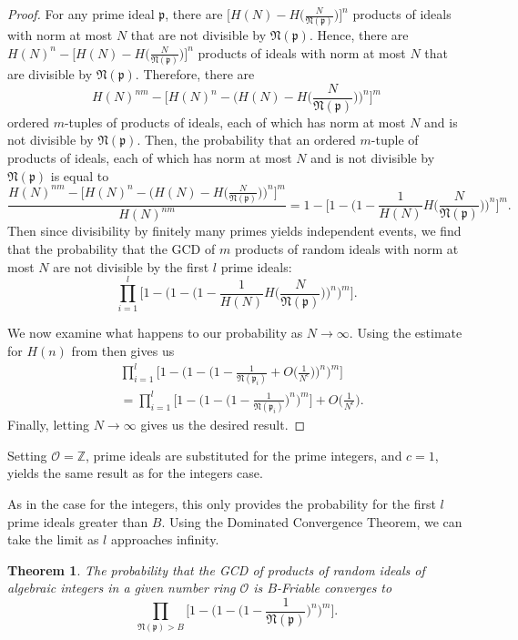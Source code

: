 \documentclass[12pt]{amsart}
\newtheorem{theorem}{Theorem}[subsection]
\theoremstyle{definition}
\newcommand{\f}[1]{\mathfrak{#1}}
\begin{document}
\begin{proof}
	For any prime ideal $\mathfrak{p}$, there are $\bigl[H(N)-H\bigl(\frac{N}{\f{N(p)}}\bigr)\bigr]^n$ products of ideals with norm at most $N$ that are not divisible by $\f{N(p)}$. Hence, there are  $H(N)^n-\bigl[H(N)-H\bigl(\frac{N}{\f{N(p)}}\bigr)\bigr]^n$ products of ideals with norm at most \(N\) that are divisible by $\f{N(p)}$. Therefore, there are 
	$$H(N)^{nm}-\Big[H(N)^n - \Big(H(N) - H\Big(\frac{N}{\f{N(p)}}\Big)\Big)^n\Big]^m$$
	ordered $m$-tuples of products of ideals, each of which has norm at most $N$ and is not divisible by $\f{N(p)}$. Then, the probability that an ordered $m$-tuple of products of ideals, each of which has norm at most $N$ and is not divisible by $\f{N(p)}$ is equal to
	$$\frac{H(N)^{nm}-\Big[H(N)^n - \Big(H(N) - H\Big(\frac{N}{\f{N(p)}}\Big)\Big)^n\Big]^m}{H(N)^{nm}} = 1 - \Big[1 - \Big(1 - \frac{1}{H(N)} H\Big(\frac{N}{\f{N(p)}}\Big)\Big)^n\Big]^m.$$
	Then since divisibility by finitely many primes yields independent events, we find that the probability that the GCD of $m$ products of random ideals with norm at most $N$ are not divisible by the first $l$ prime ideals:
	$$\prod_{i=1}^{l} \Big[1 - \Big(1 - \Big(1 - \frac{1}{H(N)} H\Big(\frac{N}{\f{N(p)}}\Big)\Big)^n \Big)^m \Big].$$
	
	We now examine what happens to our probability as $N \to \infty$. Using the estimate for $H(n)$ from \cite{Marcus} then gives us
	\begin{align*}
		&\prod_{i=1}^{l} \Big[1 - \Big(1 - \Big(1 - \frac{1}{\f{N}(\f{p}_i)} + O\Big(\frac{1}{N^{\epsilon}}\Big) \Big)^n \Big)^m\Big]\\
		&=\prod_{i=1}^{l} \Big[1 - \Big(1 - \Big(1 - \frac{1}{\f{N}(\f{p}_i)}\Big)^n \Big)^m \Big] + O\Big(\frac{1}{N^{\epsilon}}\Big).
	\end{align*}
	Finally, letting $N\to\infty$ gives us the desired result. 
\end{proof}

Setting \(\mathcal{O}=\mathbb{Z}\), prime ideals are substituted for the prime integers, and \(c=1\), yields the same result as for the integers case. 

As in the case for the integers, this only provides the probability for the first \(l\) prime ideals greater than \(B\). Using the Dominated Convergence Theorem, we can take the limit as \(l\) approaches infinity.

\begin{theorem}
	The probability that the GCD of products of random ideals of algebraic integers in a given number ring $\mathcal{O}$ is $B$-Friable converges to
	$$\prod_{\f{N}(\f{p})>B}\Big[1 - \Big(1 - \Big(1 - \frac{1}{\f{N}(\f{p})}\Big)^n \Big)^m \Big].$$
\end{theorem}
\end{document}
